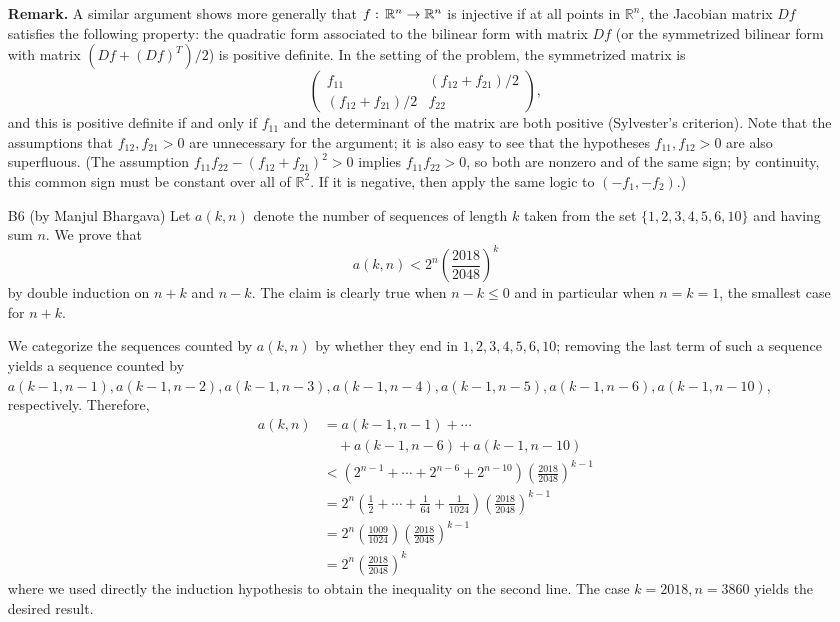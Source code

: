 \documentclass[amssymb,twocolumn,pra,10pt,aps]{revtex4-1}
\begin{document}
\begin{itemize}
\noindent
\textbf{Remark.}
A similar argument shows more generally that $f:\thinspace \mathbb{R}^n \to \mathbb{R}^n$ is injective if at all points in $\mathbb{R}^n$, the Jacobian matrix $Df$ satisfies the following property: the quadratic form associated to the bilinear form with matrix $Df$ (or the symmetrized bilinear form with matrix $(Df+(Df)^T)/2$) is positive definite. In the setting of the problem, the symmetrized matrix is
\[
\left( \begin{matrix} f_{11} & (f_{12}+f_{21})/2 \\ (f_{12}+f_{21})/2 & f_{22} \end{matrix} \right),
\]
and this is positive definite if and only if $f_{11}$ and the determinant of the matrix are both positive
(Sylvester's criterion). Note that the assumptions that $f_{12},f_{21}>0$ are unnecessary for the argument;
it is also easy to see that the hypotheses $f_{11}, f_{12} > 0$ are also superfluous.
(The assumption $f_{11}f_{22}-(f_{12}+f_{21})^2 > 0$ implies $f_{11} f_{22} > 0$, so both are nonzero and of the same sign; by continuity, this common sign must be constant over all of $\mathbb{R}^2$. If it is negative, then
apply the same logic to $(-f_1, -f_2)$.) 

\item[B6]
(by Manjul Bhargava)
Let $a(k,n)$ denote the number of sequences of length $k$ taken from the set $\{1,2,3,4,5,6,10\}$ and having sum $n$.
We prove that 
\[
a(k,n) < 2^n \left( \frac{2018}{2048} \right)^k
\]
by double induction on $n+k$ and $n-k$.  The claim is clearly true when $n-k \leq 0$ and in particular when $n=k=1$, the smallest case for $n+k$.

We categorize the sequences counted by $a(k,n)$ by whether they end in $1,2,3,4,5,6,10$; removing the last
term of such a sequence yields a sequence counted by $a(k-1,n-1), a(k-1,n-2), a(k-1,n-3), a(k-1,n-4), a(k-1,n-5), a(k-1,n-6), a(k-1,n-10)$, respectively.  Therefore,
\begin{align*}
a(k,n) &= a(k-1,n-1) + \cdots \\
&\quad + a(k-1,n-6) + a(k-1,n-10) \\
&< (  2^{n-1} + \cdots +   2^{n-6}  +  2^{n-10} ) \left( \frac{2018}{2048} \right)^{k-1} \\
&= 2^n \left( \frac{1}{2} + \cdots + \frac{1}{64} + \frac{1}{1024} \right) \left( \frac{2018}{2048} \right)^{k-1} \\
&= 2^n \left( \frac{1009}{1024} \right) \left( \frac{2018}{2048} \right)^{k-1} \\
&= 2^n \left( \frac{2018}{2048} \right)^{k}
\end{align*}
where we used directly the induction hypothesis to obtain the inequality on the second line.
The case $k=2018, n=3860$ yields the desired result.


\end{itemize}
\end{document}
